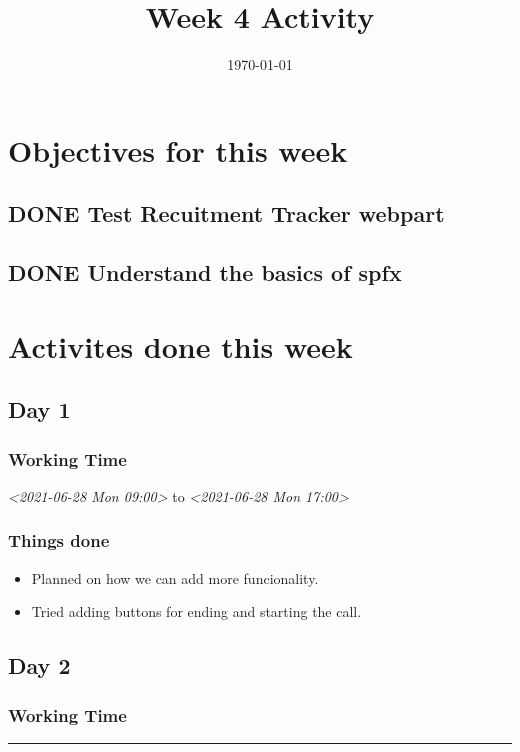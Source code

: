 \documentclass[11pt]{article}
\date{\today}
\title{Week 4 Activity}
\begin{document}
\maketitle
\section*{Objectives for this week}
\label{sec:org33d808c}
\subsection*{{\bfseries\sffamily DONE} Test Recuitment Tracker webpart}
\label{sec:org1188fd6}
\subsection*{{\bfseries\sffamily DONE} Understand the basics of spfx}
\label{sec:org088602e}

\section*{Activites done this week}
\label{sec:org1e31d01}
\subsection*{Day 1}
\label{sec:org8bb9e16}
\subsubsection*{Working Time}
\label{sec:orgc4113b8}
\textit{<2021-06-28 Mon 09:00> } to \textit{<2021-06-28 Mon 17:00>}

\subsubsection*{Things done}
\label{sec:org7b3a41f}
\begin{itemize}
\item Planned on how we can add more funcionality.
\item Tried adding buttons for ending and starting the call.
\end{itemize}

\subsection*{Day 2}
\label{sec:org7c56d6a}

\subsubsection*{Working Time}
\label{sec:org5995dd8}
\noindent\rule{\textwidth}{0.5pt}
\end{document}

